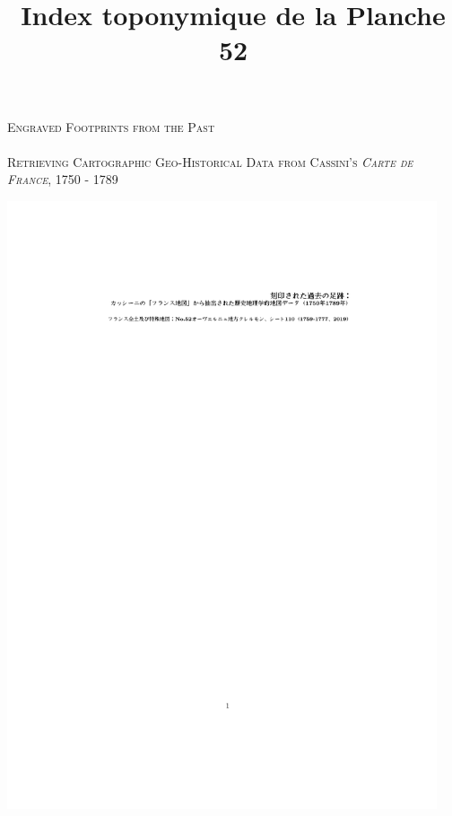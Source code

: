 \documentclass[portrait, A0]{sciposter}
\title{Index toponymique de la Planche 52}
\institute{EHESS}
\begin{document}
{}
\bgroup
\setlength{\parindent}{-0.1em} 
\begin{minipage}[t]{0.55\textwidth}
  \Huge
  \textsc{Engraved Footprints from the Past}\\ \\
  \Large \textsc{Retrieving Cartographic Geo-Historical Data from Cassini’s \emph{Carte de France}, 1750 - 1789}
\end{minipage}
\begin{minipage}[t]{0.45\textwidth}
  \vspace*{-3.2cm}
  \hfill
  \includegraphics[width=0.95\textwidth, trim= 5cm 26cm 4cm 22cm, clip]{gfx/jap.pdf}
\end{minipage}
\egroup

\vspace{1cm}
\end{document}
